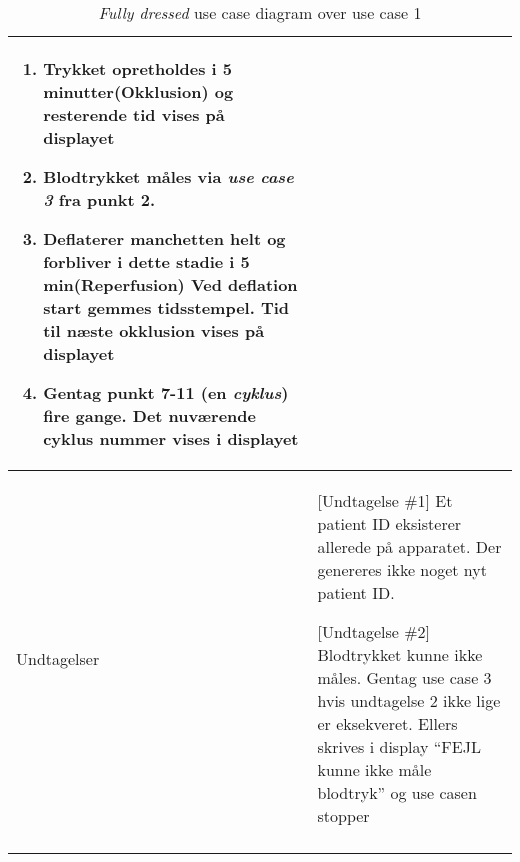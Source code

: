 \begin{center}
\begin{longtable}{ | p{} | p{}| }
\begin{enumerate}
				\item Trykket opretholdes i 5 minutter(Okklusion) og resterende tid vises på displayet
				\item Blodtrykket måles via \textit{use case 3}
				fra punkt 2.
				\item Deflaterer manchetten helt og forbliver i dette stadie i 5 min(Reperfusion) Ved deflation start gemmes tidsstempel. Tid til næste okklusion vises på displayet
				\item Gentag punkt 7-11 (en \textit{cyklus}) fire gange. Det nuværende cyklus nummer vises i displayet
			\end{enumerate} \\ 
			\hline
			Undtagelser & [Undtagelse \#1] Et patient ID eksisterer allerede på apparatet. Der genereres ikke noget nyt patient ID.
			
			[Undtagelse \#2] Blodtrykket kunne ikke måles. Gentag use case 3 hvis undtagelse 2 ikke lige er eksekveret. Ellers skrives i display “FEJL kunne ikke måle blodtryk” og use casen stopper  \\
			\hline
			\caption{\textit{Fully dressed} use case diagram over use case 1}
		\end{longtable}
		
	\end{center}